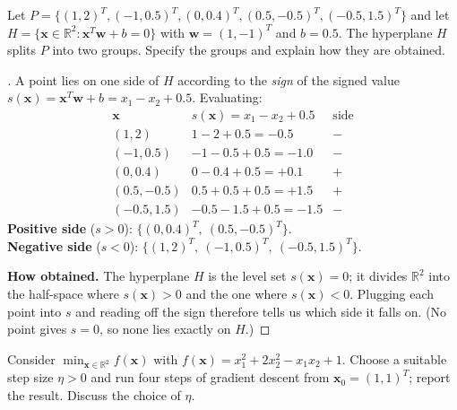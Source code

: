 \documentclass[en,hazy,blue,12pt,normal]{../../elegantnote}
\begin{document}
\begin{homework}
Let $P=\{(1,2)^T,(-1,0.5)^T,(0,0.4)^T,(0.5,-0.5)^T,(-0.5,1.5)^T\}$ and let $H=\{\bm x\in\mathbb R^2:
\bm x^T\bm w+b=0\}$ with $\bm w=(1,-1)^T$ and $b=0.5$. The hyperplane $H$ splits $P$ into two groups.
Specify the groups and explain how they are obtained.
\end{homework}

\begin{proof}[\solutionname]
A point lies on one side of $H$ according to the \emph{sign} of the signed value
$s(\bm x)=\bm x^T\bm w+b = x_1-x_2+0.5$. Evaluating:
\[
\begin{array}{c|c|c}
\bm x & s(\bm x)=x_1-x_2+0.5 & \text{side}\\\hline
(1,2) & 1-2+0.5=-0.5 & -\\
(-1,0.5) & -1-0.5+0.5=-1.0 & -\\
(0,0.4) & 0-0.4+0.5=+0.1 & +\\
(0.5,-0.5) & 0.5+0.5+0.5=+1.5 & +\\
(-0.5,1.5) & -0.5-1.5+0.5=-1.5 & -
\end{array}
\]
\textbf{Positive side} ($s>0$): $\{(0,0.4)^T,\ (0.5,-0.5)^T\}$.\\
\textbf{Negative side} ($s<0$): $\{(1,2)^T,\ (-1,0.5)^T,\ (-0.5,1.5)^T\}$.

\noindent\textbf{How obtained.} The hyperplane $H$ is the level set $s(\bm x)=0$; it divides $\mathbb
R^2$ into the half-space where $s(\bm x)>0$ and the one where $s(\bm x)<0$. Plugging each point into
$s$ and reading off the sign therefore tells us which side it falls on. (No point gives $s=0$, so none
lies exactly on $H$.)
\end{proof}

\begin{homework}
Consider $\min_{\bm x\in\mathbb R^2} f(\bm x)$ with $f(\bm x)=x_1^2+2x_2^2-x_1x_2+1$. Choose a
suitable step size $\eta>0$ and run four steps of gradient descent from $\bm x_0=(1,1)^T$; report the
result. Discuss the choice of $\eta$.
\end{homework}
\end{document}
